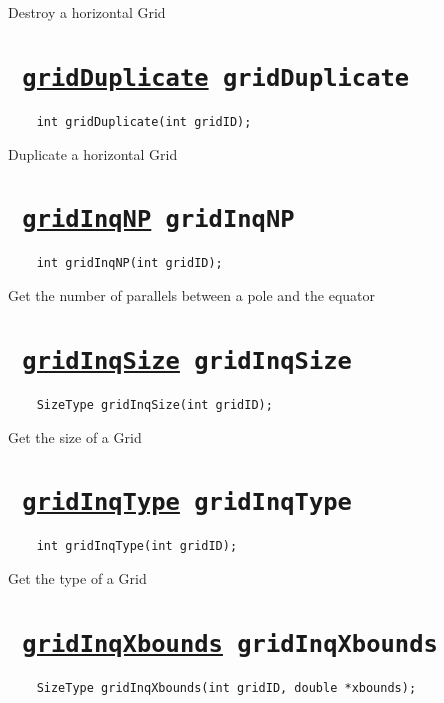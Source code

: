 Destroy a horizontal Grid
\ifpdfoutput{}{(\ref{gridDestroy})}


\section*{\texttt{ 
\ifpdf
\hyperref[gridDuplicate]{gridDuplicate}
\else
gridDuplicate
\fi
}}
\begin{verbatim}
    int gridDuplicate(int gridID);
\end{verbatim}

Duplicate a horizontal Grid
\ifpdfoutput{}{(\ref{gridDuplicate})}


\section*{\texttt{ 
\ifpdf
\hyperref[gridInqNP]{gridInqNP}
\else
gridInqNP
\fi
}}
\begin{verbatim}
    int gridInqNP(int gridID);
\end{verbatim}

Get the number of parallels between a pole and the equator
\ifpdfoutput{}{(\ref{gridInqNP})}


\section*{\texttt{ 
\ifpdf
\hyperref[gridInqSize]{gridInqSize}
\else
gridInqSize
\fi
}}
\begin{verbatim}
    SizeType gridInqSize(int gridID);
\end{verbatim}

Get the size of a Grid
\ifpdfoutput{}{(\ref{gridInqSize})}


\section*{\texttt{ 
\ifpdf
\hyperref[gridInqType]{gridInqType}
\else
gridInqType
\fi
}}
\begin{verbatim}
    int gridInqType(int gridID);
\end{verbatim}

Get the type of a Grid
\ifpdfoutput{}{(\ref{gridInqType})}


\section*{\texttt{ 
\ifpdf
\hyperref[gridInqXbounds]{gridInqXbounds}
\else
gridInqXbounds
\fi
}}
\begin{verbatim}
    SizeType gridInqXbounds(int gridID, double *xbounds);
\end{verbatim}


